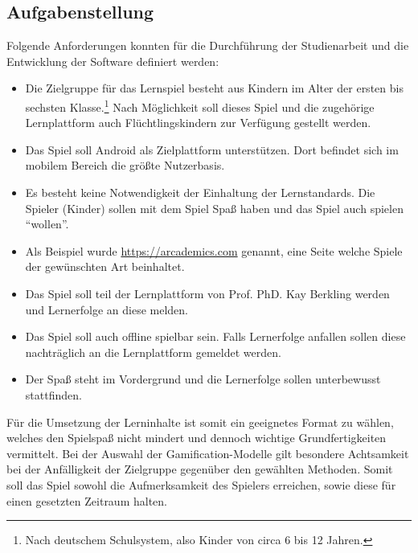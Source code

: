 \subsection{Aufgabenstellung}
	Folgende Anforderungen konnten für die Durchführung der Studienarbeit und die Entwicklung der Software definiert werden:
	\begin{itemize}
		\item{ Die Zielgruppe für das Lernspiel besteht aus Kindern im Alter der ersten bis sechsten Klasse.\footnote{Nach deutschem Schulsystem, also Kinder von circa 6 bis 12 Jahren.} Nach Möglichkeit soll dieses Spiel und die zugehörige Lernplattform auch Flüchtlingskindern zur Verfügung gestellt werden. }
		\item{ Das Spiel soll Android als Zielplattform unterstützen. Dort befindet sich im mobilem Bereich die größte Nutzerbasis. }
		\item{ Es besteht keine Notwendigkeit der Einhaltung der Lernstandards. Die Spieler (Kinder) sollen mit dem Spiel Spaß haben und das Spiel auch spielen \enquote{wollen}. }
		\item{ Als Beispiel wurde \url{https://arcademics.com} genannt, eine Seite welche Spiele der gewünschten Art beinhaltet. }
		\item{ Das Spiel soll teil der Lernplattform von Prof. PhD. Kay Berkling werden und Lernerfolge an diese melden. }
		\item{ Das Spiel soll auch offline spielbar sein. Falls Lernerfolge anfallen sollen diese nachträglich an die Lernplattform gemeldet werden. }
		\item{ Der Spaß steht im Vordergrund und die Lernerfolge sollen unterbewusst stattfinden. }
	\end{itemize}
	Für die Umsetzung der Lerninhalte ist somit ein geeignetes Format zu wählen, welches den Spielspaß nicht mindert und dennoch wichtige Grundfertigkeiten vermittelt.
	Bei der Auswahl der Gamification-Modelle gilt besondere Achtsamkeit bei der Anfälligkeit der Zielgruppe gegenüber den gewählten Methoden. Somit soll das Spiel sowohl die Aufmerksamkeit des Spielers erreichen, sowie diese für einen gesetzten Zeitraum halten.

